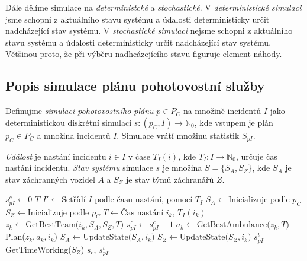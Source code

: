 Dále dělíme simulace na \textit{deterministcké} a \textit{stochastické}.
V \textit{deterministické simulaci} jsme schopni z aktuálního stavu systému a údalosti deterministicky určit nadcházející stav systému.
V \textit{stochastické simulaci} nejsme schopni z aktuálního stavu systému a údalosti deterministicky určit nadcházející stav systému.
Většinou proto, že při výběru nadhcázejícího stavu figuruje element náhody.
\cite{SimulaceBook}

\subsection{Popis simulace plánu pohotovostní služby}\label{kap:definiceSimulace}

\begin{definice}
  Definujme \textit{simulaci pohotovostního plánu} $p \in P_C$ na množině incidentů $I$ jako deterministickou diskrétní simulaci
  $s \colon (p_C, I) \rightarrow \mathbb{N}_0$, kde vstupem je plán $p_C \in P_C$ a množina incidentů $I$.
  Simulace vrátí množinu statistik $S_{pI}$.
\end{definice}

\textit{Událost} je nastání incidentu $i \in I$ v čase $T_I(i)$, kde $T_I \colon I \rightarrow \mathbb{N}_0$, určuje čas nastání incidentu.
\textit{Stav systému} simulace $s$ je množina $S = \{ S_A, S_Z \}$, kde $S_A$ je stav záchranných vozidel $A$ a $S_Z$ je stav týmů záchranářů $Z$. 

\begin{algorithm}
  \begin{algorithmic}[1]
    \State $s^{c}_{pI} \gets 0$
    \State $T$ 
    \State $I' \gets \mbox{Setřídí $I$ podle času nastání, pomocí $T_I$}$
    \State $S_A \gets \mbox{Inicializuje podle $p_C$}$
    \State $S_Z \gets \mbox{Inicializuje podle $p_C$}$
      \State $T \gets \mbox{Čas nastání $i_k$, $T_I(i_k)$}$
      \State $z_k \gets \mbox{GetBestTeam($i_k, S_A, S_Z, T$)}$
        \State $s^{c}_{pI} \gets s^{c}_{pI} + 1$
        \State $a_k \gets \mbox{GetBestAmbulance($z_k, T$)}$
        \State Plan($z_k, a_k, i_k$)
        \State $S_A \gets \mbox{UpdateState($S_A, i_k$)}$
        \State $S_Z \gets \mbox{UpdateState($S_Z, i_k$)}$
      \EndIf
    \EndFor
    \State $s^t_{pI}$ \gets \mbox{GetTimeWorking($S_Z$)}
    \State \Return $s_{c}$, $s^t_{pI}$
  \EndFunction
  \end{algorithmic}
  \caption{}
  \label{simulaceAlgo}
\end{algorithm}

